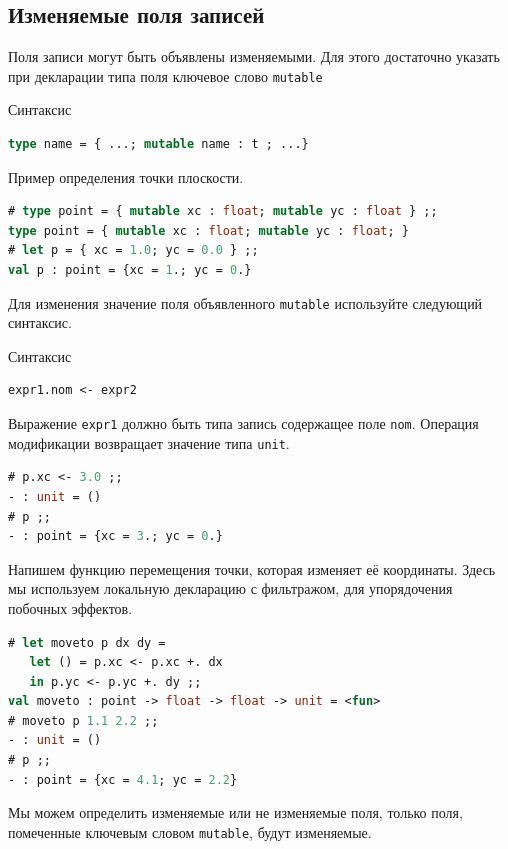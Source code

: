 \subsection{Изменяемые поля записей}

Поля записи могут быть объявлены изменяемыми. Для этого достаточно указать при
декларации типа поля ключевое слово \texttt{mutable}

Синтаксис

\begin{lstlisting}[language=OCaml]
type name = { ...; mutable name : t ; ...}
\end{lstlisting}

Пример определения точки плоскости.

\begin{lstlisting}[language=OCaml]
# type point = { mutable xc : float; mutable yc : float } ;;
type point = { mutable xc : float; mutable yc : float; }
# let p = { xc = 1.0; yc = 0.0 } ;;
val p : point = {xc = 1.; yc = 0.}
\end{lstlisting}

Для изменения значение поля объявленного \texttt{mutable} используйте следующий
синтаксис.

Синтаксис

\begin{lstlisting}[language=OCaml]
expr1.nom <- expr2
\end{lstlisting}

Выражение \texttt{expr1} должно быть типа запись содержащее поле \texttt{nom}.
Операция модификации возвращает значение типа \texttt{unit}.

\begin{lstlisting}[language=OCaml]
# p.xc <- 3.0 ;;
- : unit = ()
# p ;;
- : point = {xc = 3.; yc = 0.}
\end{lstlisting}

Напишем функцию перемещения точки, которая изменяет её координаты. Здесь мы
используем локальную декларацию с фильтражом, для упорядочения побочных
эффектов.

\begin{lstlisting}[language=OCaml]
# let moveto p dx dy =
   let () = p.xc <- p.xc +. dx
   in p.yc <- p.yc +. dy ;;
val moveto : point -> float -> float -> unit = <fun>
# moveto p 1.1 2.2 ;;
- : unit = ()
# p ;;
- : point = {xc = 4.1; yc = 2.2}
\end{lstlisting}

Мы можем определить изменяемые или не изменяемые поля, только поля, помеченные
ключевым словом \texttt{mutable}, будут изменяемые.

